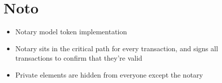 \section{Noto}

\begin{itemize}
  \item Notary model token implementation
  \item Notary sits in the critical path for every transaction, and signs all transactions to confirm that they're valid
  \item Private elements are hidden from everyone except the notary
\end{itemize}